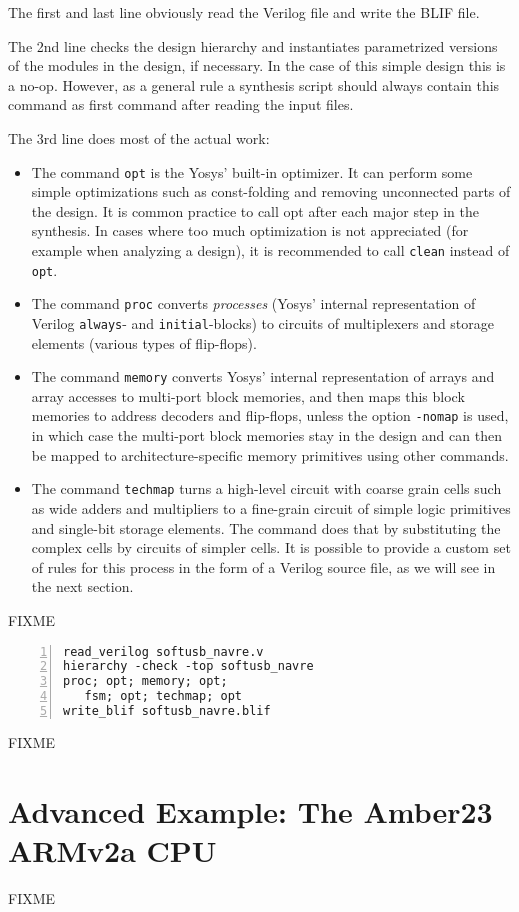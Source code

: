 The first and last line obviously read the Verilog file and write the BLIF
file. 

\medskip

The 2nd line checks the design hierarchy and instantiates parametrized 
versions of the modules in the design, if necessary. In the case of this
simple design this is a no-op. However, as a general rule a synthesis script
should always contain this command as first command after reading the input
files.

\medskip

The 3rd line does most of the actual work:

\begin{itemize}
\item The command {\tt opt} is the Yosys' built-in optimizer. It can perform
some simple optimizations such as const-folding and removing unconnected parts
of the design. It is common practice to call opt after each major step in the
synthesis. In cases where too much optimization is not appreciated (for example
when analyzing a design), it is recommended to call {\tt clean} instead of {\tt
opt}.
\item The command {\tt proc} converts {\it processes} (Yosys' internal
representation of Verilog {\tt always}- and {\tt initial}-blocks) to circuits
of multiplexers and storage elements (various types of flip-flops).
\item The command {\tt memory} converts Yosys' internal representation of 
arrays and array accesses to multi-port block memories, and then maps this
block memories to address decoders and flip-flops, unless the option {\tt -nomap}
is used, in which case the multi-port block memories stay in the design
and can then be mapped to architecture-specific memory primitives using
other commands.
\item The command {\tt techmap} turns a high-level circuit with coarse grain
cells such as wide adders and multipliers to a fine-grain circuit of simple
logic primitives and single-bit storage elements. The command does that by
substituting the complex cells by circuits of simpler cells. It is possible
to provide a custom set of rules for this process in the form of a Verilog
source file, as we will see in the next section.
\end{itemize}

{\color{red} FIXME}

\begin{lstlisting}[frame=trBL,xleftmargin=2em,numbers=left]
read_verilog softusb_navre.v
hierarchy -check -top softusb_navre
proc; opt; memory; opt;
   fsm; opt; techmap; opt
write_blif softusb_navre.blif
\end{lstlisting}

{\color{red} FIXME}

\section{Advanced Example: The Amber23 ARMv2a CPU}

{\color{red} FIXME}

